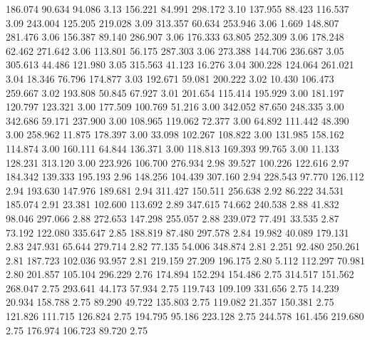  186.074   90.634   94.086         3.13
 156.221   84.991  298.172         3.10
 137.955   88.423  116.537         3.09
 243.004  125.205  219.028         3.09
 313.357   60.634  253.946         3.06
   1.669  148.807  281.476         3.06
 156.387   89.140  286.907         3.06
 176.333   63.805  252.309         3.06
 178.248   62.462  271.642         3.06
 113.801   56.175  287.303         3.06
 273.388  144.706  236.687         3.05
 305.613   44.486  121.980         3.05
 315.563   41.123   16.276         3.04
 300.228  124.064  261.021         3.04
  18.346   76.796  174.877         3.03
 192.671   59.081  200.222         3.02
  10.430  106.473  259.667         3.02
 193.808   50.845   67.927         3.01
 201.654  115.414  195.929         3.00
 181.197  120.797  123.321         3.00
 177.509  100.769   51.216         3.00
 342.052   87.650  248.335         3.00
 342.686   59.171  237.900         3.00
 108.965  119.062   72.377         3.00
  64.892  111.442   48.390         3.00
 258.962   11.875  178.397         3.00
  33.098  102.267  108.822         3.00
 131.985  158.162  114.874         3.00
 160.111   64.844  136.371         3.00
 118.813  169.393   99.765         3.00
  11.133  128.231  313.120         3.00
 223.926  106.700  276.934         2.98
  39.527  100.226  122.616         2.97
 184.342  139.333  195.193         2.96
 148.256  104.439  307.160         2.94
 228.543   97.770  126.112         2.94
 193.630  147.976  189.681         2.94
 311.427  150.511  256.638         2.92
  86.222   34.531  185.074         2.91
  23.381  102.600  113.692         2.89
 347.615   74.662  240.538         2.88
  41.832   98.046  297.066         2.88
 272.653  147.298  255.057         2.88
 239.072   77.491   33.535         2.87
  73.192  122.080  335.647         2.85
 188.819   87.480  297.578         2.84
  19.982   40.089  179.131         2.83
 247.931   65.644  279.714         2.82
  77.135   54.006  348.874         2.81
   2.251   92.480  250.261         2.81
 187.723  102.036   93.957         2.81
 219.159   27.209  196.175         2.80
   5.112  112.297   70.981         2.80
 201.857  105.104  296.229         2.76
 174.894  152.294  154.486         2.75
 314.517  151.562  268.047         2.75
 293.641   44.173   57.934         2.75
 119.743  109.109  331.656         2.75
  14.239   20.934  158.788         2.75
  89.290   49.722  135.803         2.75
 119.082   21.357  150.381         2.75
 121.826  111.715  126.824         2.75
 194.795   95.186  223.128         2.75
 244.578  161.456  219.680         2.75
 176.974  106.723   89.720         2.75
